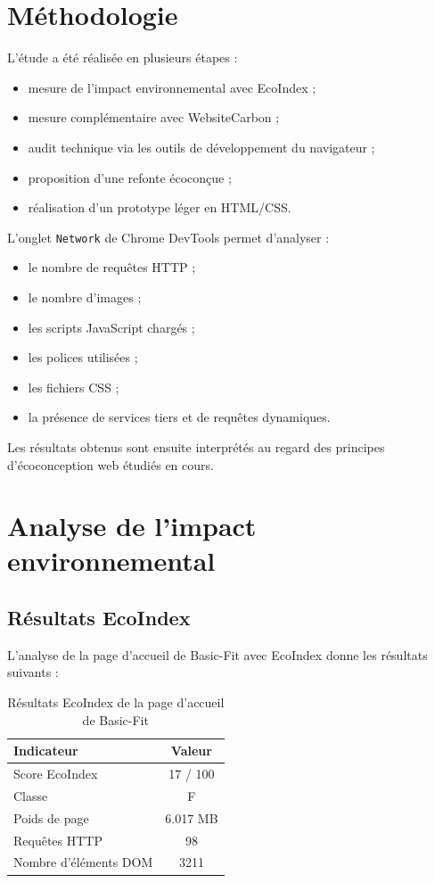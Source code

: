 \documentclass[11pt,a4paper]{article}
\begin{document}
\section{Méthodologie}

L'étude a été réalisée en plusieurs étapes :

\begin{itemize}
\item mesure de l'impact environnemental avec EcoIndex ;
\item mesure complémentaire avec WebsiteCarbon ;
\item audit technique via les outils de développement du navigateur ;
\item proposition d'une refonte écoconçue ;
\item réalisation d'un prototype léger en HTML/CSS.
\end{itemize}

L'onglet \texttt{Network} de Chrome DevTools permet d'analyser :
\begin{itemize}
\item le nombre de requêtes HTTP ;
\item le nombre d'images ;
\item les scripts JavaScript chargés ;
\item les polices utilisées ;
\item les fichiers CSS ;
\item la présence de services tiers et de requêtes dynamiques.
\end{itemize}

Les résultats obtenus sont ensuite interprétés au regard des principes d'écoconception web étudiés en cours.

\section{Analyse de l'impact environnemental}

\subsection{Résultats EcoIndex}

L'analyse de la page d'accueil de Basic-Fit avec EcoIndex donne les résultats suivants :

\begin{table}[H]
\centering
\caption{Résultats EcoIndex de la page d'accueil de Basic-Fit}
\begin{tabular}{lc}
\toprule
Indicateur & Valeur \\
\midrule
Score EcoIndex & 17 / 100 \\
Classe & F \\
Poids de page & 6.017 MB \\
Requêtes HTTP & 98 \\
Nombre d'éléments DOM & 3211 \\
\bottomrule
\end{tabular}
\end{table}
\end{document}
